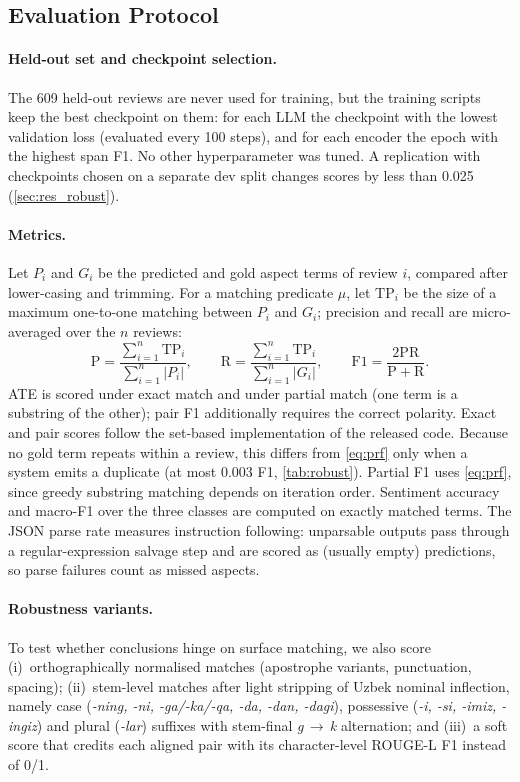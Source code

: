 \documentclass[runningheads]{llncs}
\begin{document}
\subsection{Evaluation Protocol}
\label{sec:eval}

\paragraph{Held-out set and checkpoint selection.} The 609 held-out reviews are never used for training, but the training scripts keep the best checkpoint on them: for each LLM the checkpoint with the lowest validation loss (evaluated every 100 steps), and for each encoder the epoch with the highest span F1. No other hyperparameter was tuned. A replication with checkpoints chosen on a separate dev split changes scores by less than 0.025 (\cref{sec:res_robust}).

\paragraph{Metrics.} Let $P_i$ and $G_i$ be the predicted and gold aspect terms of review $i$, compared after lower-casing and trimming. For a matching predicate $\mu$, let $\mathrm{TP}_i$ be the size of a maximum one-to-one matching between $P_i$ and $G_i$; precision and recall are micro-averaged over the $n$ reviews:
\begin{equation}
\label{eq:prf}
\mathrm{P} = \frac{\sum_{i=1}^{n} \mathrm{TP}_i}{\sum_{i=1}^{n} |P_i|}, \qquad
\mathrm{R} = \frac{\sum_{i=1}^{n} \mathrm{TP}_i}{\sum_{i=1}^{n} |G_i|}, \qquad
\mathrm{F1} = \frac{2\mathrm{P}\mathrm{R}}{\mathrm{P}+\mathrm{R}}.
\end{equation}
ATE is scored under exact match and under partial match (one term is a substring of the other); pair F1 additionally requires the correct polarity. Exact and pair scores follow the set-based implementation of the released code. Because no gold term repeats within a review, this differs from \cref{eq:prf} only when a system emits a duplicate (at most 0.003 F1, \cref{tab:robust}). Partial F1 uses \cref{eq:prf}, since greedy substring matching depends on iteration order. Sentiment accuracy and macro-F1 over the three classes are computed on exactly matched terms. The JSON parse rate measures instruction following: unparsable outputs pass through a regular-expression salvage step and are scored as (usually empty) predictions, so parse failures count as missed aspects.

\paragraph{Robustness variants.} To test whether conclusions hinge on surface matching, we also score (i)~orthographically normalised matches (apostrophe variants, punctuation, spacing); (ii)~stem-level matches after light stripping of Uzbek nominal inflection, namely case (\textit{-ning, -ni, -ga/-ka/-qa, -da, -dan, -dagi}), possessive (\textit{-i, -si, -imiz, -ingiz}) and plural (\textit{-lar}) suffixes with stem-final \textit{g}\,$\to$\,\textit{k} alternation; and (iii)~a soft score that credits each aligned pair with its character-level ROUGE-L F1 instead of 0/1.
\end{document}

